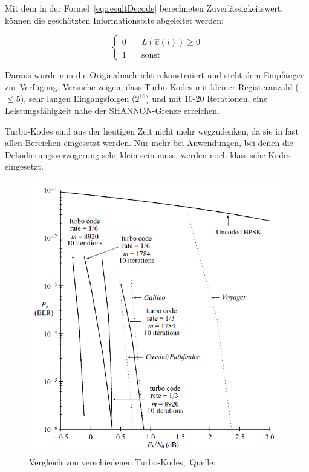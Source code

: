 Mit dem in der Formel~\ref{eq:resultDecode} berechneten Zuverlässigkeitswert, können die geschätzten Informationsbits abgeleitet werden:

\begin{equation*}
\begin{cases}
0 & \quad L(\widehat{u}(i)) \geq 0 \\
1 & \quad \text{sonst}
\end{cases}
\end{equation*}

Daraus wurde nun die Originalnachricht rekonstruiert und steht dem Empfänger zur Verfügung. Versuche zeigen, dass Turbo-Kodes mit kleiner Registeranzahl ($\leq 5$), sehr langen Eingangsfolgen ($2^{16}$) und mit 10-20 Iterationen, eine Leistungsfähigkeit nahe der SHANNON-Grenze erreichen.~\cite[265]{schoenfeld2012informations}

Turbo-Kodes sind aus der heutigen Zeit nicht mehr wegzudenken, da sie in fast allen Bereichen eingesetzt werden. Nur mehr bei Anwendungen, bei denen die Dekodierungsverzögerung sehr klein sein muss, werden noch klassische Kodes eingesetzt.

\begin{figure}[th]
\centering
\includegraphics[width=\ScaleIfNeeded]{pictures/ComparisonTurbo}
\caption{Vergleich von verschiedenen Turbo-Kodes,~Quelle:~\cite[603]{huffman2010fundamentals}}
\label{pic:comparisonTurbo}
\end{figure}

